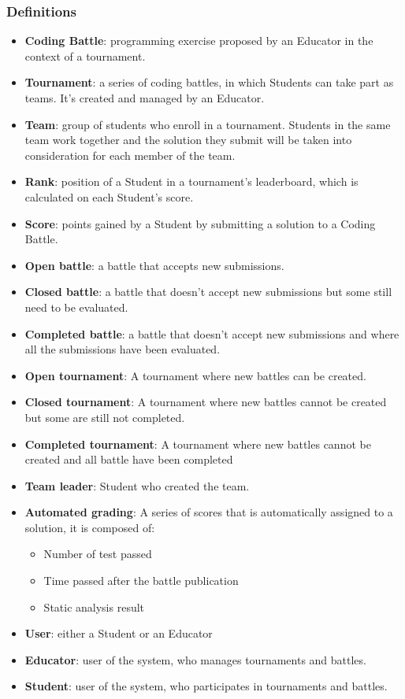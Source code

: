\documentclass{article}
\begin{document}
\subsubsection{Definitions}
\begin{itemize}
\item \textbf{Coding Battle}: programming exercise proposed by an Educator in the context of a tournament.
\item \textbf{Tournament}: a series of coding battles, in which Students can take part as teams. It’s created and managed by an Educator.
\item \textbf{Team}: group of students who enroll in a tournament. Students in the same team work together and the solution they submit will be taken into consideration for each member of the team.
\item \textbf{Rank}: position of a Student in a tournament’s leaderboard, which is calculated on each Student’s score.
\item \textbf{Score}: points gained by a Student by submitting a solution to a Coding Battle.
\item \textbf{Open battle}: a battle that accepts new submissions.
\item \textbf{Closed battle}: a battle that doesn’t accept new submissions but some still need to be evaluated.
\item \textbf{Completed battle}: a battle that doesn’t accept new submissions and where all the submissions have been evaluated.
\item \textbf{Open tournament}: A tournament where new battles can be created.
\item \textbf{Closed tournament}: A tournament where new battles cannot be created but some are still not completed.
\item \textbf{Completed tournament}: A tournament where new battles cannot be created and all battle have been completed
\item \textbf{Team leader}: Student who created the team.
\item \textbf{Automated grading}: A series of scores that is automatically assigned to a solution, it is composed of:
\begin{itemize}
\item Number of test passed
\item Time passed after the battle publication
\item Static analysis result
\end{itemize}
\item \textbf{User}: either a Student or an Educator
\item \textbf{Educator}: user of the system, who manages tournaments and battles.
\item \textbf{Student}: user of the system, who participates in tournaments and battles.
\end{itemize}
\end{document}
